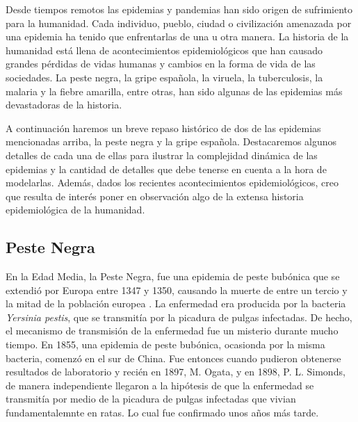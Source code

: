\graphicspath{{figs/cap3}}


Desde tiempos remotos las epidemias y pandemias han sido origen de sufrimiento para la humanidad. Cada individuo, pueblo, ciudad o civilización amenazada por una epidemia ha tenido 
que enfrentarlas de una u otra manera. La historia de la humanidad está llena de acontecimientos epidemiológicos que han causado grandes pérdidas de vidas humanas y cambios en la 
forma de vida de las sociedades. La peste negra, la gripe española, la viruela, la tuberculosis, la malaria  y la fiebre amarilla,
entre otras, han sido algunas de las epidemias más devastadoras de la historia. 

A continuación haremos un breve repaso histórico de dos de las epidemias mencionadas arriba, la peste negra y la gripe española. Destacaremos algunos detalles de cada una de 
ellas para ilustrar la complejidad dinámica de las epidemias y la cantidad de detalles que debe tenerse en cuenta a la hora de modelarlas. Además, dados los recientes 
acontecimientos epidemiológicos, creo que resulta de interés poner en observación algo de la extensa historia epidemiológica de la humanidad.

\subsection*{Peste Negra}

En la Edad Media, la Peste Negra, fue una epidemia de peste bubónica que se extendió por Europa entre 1347 y 1350, causando la muerte de entre un tercio y la mitad de la 
población europea \cite{black_death3}. La enfermedad era producida por la bacteria \textit{Yersinia pestis}, que se transmitía por la picadura de pulgas infectadas. De hecho, el mecanismo de 
transmisión de la enfermedad fue un misterio durante mucho tiempo.
En 1855, una epidemia de peste bubónica, ocasionda por la misma bacteria, comenzó en el sur de China. Fue entonces cuando pudieron obtenerse resultados de laboratorio y recién en 1897, M. Ogata, y en 1898,
P. L. Simonds, de manera independiente llegaron a la hipótesis de que la enfermedad se transmitía por medio de la picadura de pulgas infectadas que vivian fundamentalemnte en ratas. Lo cual fue confirmado unos años más tarde. 

